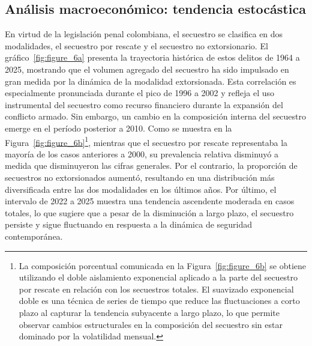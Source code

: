 \documentclass[12pt]{article}
\theoremstyle{definition}
\theoremstyle{remark}
\newcommand{\1}{\mathbf{1}}
\begin{document}
\subsection{Análisis macroeconómico: tendencia estocástica}

En virtud de la legislación penal colombiana, el secuestro se clasifica en dos modalidades, el secuestro por rescate y el secuestro no extorsionario. El gráfico~\ref{fig:figure_6a} presenta la trayectoria histórica de estos delitos de 1964 a 2025, mostrando que el volumen agregado del secuestro ha sido impulsado en gran medida por la dinámica de la modalidad extorsionada. Esta correlación es especialmente pronunciada durante el pico de 1996 a 2002 y refleja el uso instrumental del secuestro como recurso financiero durante la expansión del conflicto armado. Sin embargo, un cambio en la composición interna del secuestro emerge en el período posterior a 2010. Como se muestra en la Figura~\ref{fig:figure_6b}\footnote{La composición porcentual comunicada en la Figura~\ref{fig:figure_6b} se obtiene utilizando el doble aislamiento exponencial aplicado a la parte del secuestro por rescate en relación con los secuestros totales. El suavizado exponencial doble es una técnica de series de tiempo que reduce las fluctuaciones a corto plazo al capturar la tendencia subyacente a largo plazo, lo que permite observar cambios estructurales en la composición del secuestro sin estar dominado por la volatilidad mensual.}, mientras que el secuestro por rescate representaba la mayoría de los casos anteriores a 2000, su prevalencia relativa disminuyó a medida que disminuyeron las cifras generales. Por el contrario, la proporción de secuestros no extorsionados aumentó, resultando en una distribución más diversificada entre las dos modalidades en los últimos años. Por último, el intervalo de 2022 a 2025 muestra una tendencia ascendente moderada en casos totales, lo que sugiere que a pesar de la disminución a largo plazo, el secuestro persiste y sigue fluctuando en respuesta a la dinámica de seguridad contemporánea.
\end{document}
